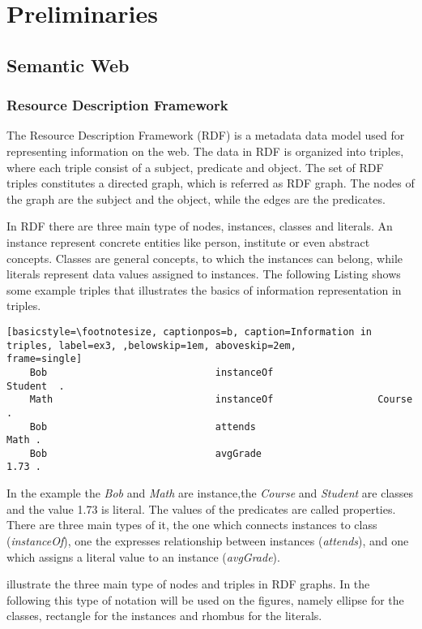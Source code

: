 \chapter{Preliminaries}

\section{Semantic Web}

\subsection{Resource Description Framework}


The Resource Description Framework (RDF) is a metadata data model used for representing information on the web. The data in RDF is organized into triples, where each triple consist of a subject, predicate and object. The set of RDF triples constitutes a directed graph, which is referred as RDF graph. The nodes of the graph are the subject and the object, while the edges are the predicates.

In RDF there are three main type of nodes, instances, classes and literals. An instance represent concrete entities like person, institute or even abstract concepts. Classes are general concepts, to which the instances can belong, while literals represent data values assigned to instances. The following Listing shows some example triples that illustrates the basics of information representation in triples.

\begin{lstlisting}[basicstyle=\footnotesize, captionpos=b, caption=Information in triples, label=ex3, ,belowskip=1em, aboveskip=2em,
frame=single]
	Bob								instanceOf					Student  .
	Math							instanceOf					Course . 		
	Bob								attends							Math . 		
	Bob								avgGrade						1.73 .
\end{lstlisting}

In the example the \textit{Bob} and \textit{Math} are instance,the \textit{Course} and \textit{Student} are classes and the value 1.73 is literal. The values of the predicates are called properties. There are three main types of it, the one which connects instances to class (\textit{instanceOf}), one the expresses relationship between instances (\textit{attends}), and one which assigns a literal value to an instance (\textit{avgGrade}). 



 illustrate the three main type of nodes and triples in RDF graphs. In the following this type of notation will be used on the figures, namely ellipse for the classes, rectangle for the instances and rhombus for the literals.


